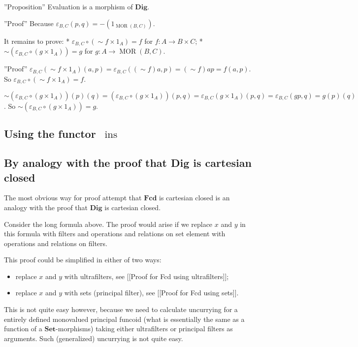 ''Proposition'' Evaluation is a morphism of $\mathbf{Dig}$.

''Proof'' Because $\varepsilon_{B, C} ( p , q) = - ( 1_{\operatorname{MOR} ( B , C)})$.

It remains to prove:
* $\varepsilon_{B, C} \circ ( \sim f \times 1_{A}) = f$ for $f : A \rightarrow B \times C$;
* $\sim ( \varepsilon_{B, C} \circ ( g \times 1_{A})) = g$ for $g : A \rightarrow \operatorname{MOR} ( B , C)$.

''Proof'' $\varepsilon_{B, C} ( \sim f \times 1_{A}) ( a , p) = \varepsilon_{B, C} ( ( \sim f) a , p) = ( \sim f) a p = f ( a , p)$. So $\varepsilon_{B, C} \circ ( \sim f \times 1_{A}) = f$.

  $\sim ( \varepsilon_{B, C} \circ ( g \times 1_{A})) ( p) ( q) = ( \varepsilon_{B, C} \circ ( g \times 1_{A})) ( p , q) = \varepsilon_{B, C} ( g \times 1_{A}) ( p , q) = \varepsilon_{B, C} ( g p , q) = g ( p) ( q)$. So $\sim ( \varepsilon_{B, C} \circ ( g \times 1_{A})) = g$.

\subsection{Using the functor~$\operatorname{ins}$}

\subsection{By analogy with the proof that Dig is cartesian closed}

The most obvious way for proof attempt that $\mathbf{Fcd}$ is cartesian closed is an analogy with the proof that
$\mathbf{Dig}$ is cartesian closed.

Consider the long formula above. The proof would arise if we replace $x$ and $y$ in this formula with filters and operations and relations on set element with operations and relations on filters.

This proof could be simplified in either of two ways:
\begin{itemize}
\item replace $x$ and $y$ with ultrafilters, see [[Proof for Fcd using ultrafilters]];
\item replace $x$ and $y$ with sets (principal filter), see [[Proof for Fcd using sets]].
\end{itemize}

This is not quite easy however, because we need to calculate uncurrying for a entirely defined monovalued principal funcoid (what is essentially the same as a function of a $\mathbf{Set}$-morphisms) taking either ultrafilters or principal filters as arguments. Such (generalized) uncurrying is not quite easy.

